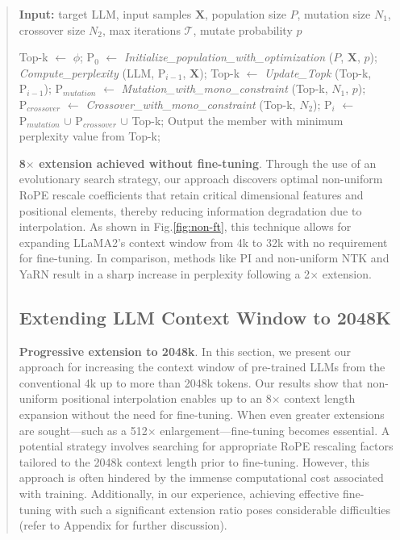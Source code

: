 \begin{abstract}
\begin{algorithm}[t]
	\small
	\caption{The search algorithm}
	\textbf{Input:} target LLM, input samples $\mathbf{X}$,   population size $P$, mutation size $N_1$, crossover size $N_2$, max iterations $\mathcal{T}$, mutate probability $p$\\

	\begin{algorithmic}[1]
		\label{alg:search}
		\STATE Top-k $\leftarrow$ $\phi$;
		\STATE $\text{P}_0$ $\leftarrow$ \textit{Initialize\_population\_with\_optimization} ($P$, $\mathbf{X}$, $p$);
		\STATE \textit{Compute\_perplexity} (LLM, $\text{P}_{i-1}$, $\mathbf{X}$);
		\STATE  Top-k $\leftarrow$ \textit{Update\_Topk} (Top-k, $\text{P}_{i-1}$);
		\STATE$\text{P}_{mutation}$ $\leftarrow$ \textit{Mutation\_with\_mono\_constraint} (Top-k, $N_1$, $p$); 
		\STATE $\text{P}_{crossover}$ $\leftarrow$ \textit{Crossover\_with\_mono\_constraint} (Top-k, $N_2$);
		\STATE $\text{P}_i$ $\leftarrow$ $\text{P}_{mutation}$ $\cup$ $\text{P}_{crossover}$ $\cup$ Top-k;
		\ENDFOR
		\STATE Output the member with minimum perplexity value from Top-k;
	\end{algorithmic}
\end{algorithm}

\textbf{8$\times$ extension achieved without fine-tuning}. Through the use of an evolutionary search strategy, our approach discovers optimal non-uniform RoPE rescale coefficients that retain critical dimensional features and positional elements, thereby reducing information degradation due to interpolation. As shown in Fig.\ref{fig:non-ft}, this technique allows for expanding LLaMA2's context window from 4k to 32k with no requirement for fine-tuning. In comparison, methods like PI and non-uniform NTK and YaRN result in a sharp increase in perplexity following a 2$\times$ extension.

\subsection{Extending LLM Context Window to 2048K}
\label{sec:extendto2048k}

\textbf{Progressive extension to 2048k}. In this section, we present our approach for increasing the context window of pre-trained LLMs from the conventional 4k up to more than 2048k tokens. Our results show that non-uniform positional interpolation enables up to an 8$\times$ context length expansion without the need for fine-tuning. When even greater extensions are sought—such as a 512$\times$ enlargement—fine-tuning becomes essential. A potential strategy involves searching for appropriate RoPE rescaling factors tailored to the 2048k context length prior to fine-tuning. However, this approach is often hindered by the immense computational cost associated with training. Additionally, in our experience, achieving effective fine-tuning with such a significant extension ratio poses considerable difficulties (refer to Appendix for further discussion).


\end{abstract}
